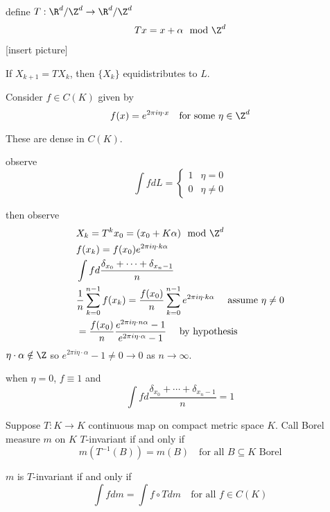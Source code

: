 \begin{definition}
	define $T : \R^d / \Z^d \to \R^d/ \Z^d $
\begin{align*}
	T x = x + \alpha \mod{\Z^d}
\end{align*} 
[insert picture]
\begin{claim}
If $X_{k+1} = T X_{k}$, then $\{X_k\}$ equidistributes to  $L$.
\end{claim}

Consider $f \in C(K)$ given by 
\[
	f(x) = e^{2 \pi i \eta \cdot x} \quad \text{for some } \eta \in \Z^d
\] 
\end{definition}

\begin{exercise}
	These are dense in $C(K)$.
\end{exercise}

observe
\[
	\int f dL = 
	\begin{cases}
		1 & \eta = 0 \\
		0 & \eta \neq 0
	\end{cases}
\] 

then observe
\begin{align*}
	&X_k = T^{k} x_0 = (x_0 + K\alpha) \mod{\Z^d} \\
	&f(x_k) = f(x_0) e^{2 \pi i \eta \cdot k \alpha} \\
	&\int f d \frac{\delta_{x_0} + \cdots + \delta_{x_n -1}}{n} \\
	&\frac{1}{n} \sum_{k=0}^{n-1} f(x_k) = \frac{f(x_0)}{n} \sum_{k=0}^{n-1} e^{2\pi i \eta \cdot k\alpha} \quad \text{ assume } \eta \neq 0 \\
	&= \frac{f(x_0)}{n} \frac{e^{2\pi i \eta \cdot n\alpha} -1}{e^{2\pi i \eta \cdot \alpha } -1} \quad \text{ by hypothesis}
\end{align*} 
$\eta \cdot \alpha \notin \Z$ so $e^{2\pi i \eta \cdot \alpha} - 1 \neq 0 \to 0$ as $n \to \infty$.


when $\eta =0$, $f \equiv 1$ and
\[
	\int f d \frac{\delta_{x_0} + \cdots + \delta_{x_n -1}}{n} =1
\] 

\begin{definition}
	Suppose $T:K \to K$ continuous map on compact metric space $K$. Call Borel measure $m$ on $K$ $T$-invariant if and only if
	\[
		m(T^{-1}(B)) = m(B) \quad \text{for all } B \subseteq K \text{ Borel}
	\] 
\end{definition}


\begin{example}
	$m$ is $T$-invariant if and only if 
	\[
		\int f dm = \int f \circ T dm \quad \text{for all } f \in C(K)
	\] 
\end{example}

